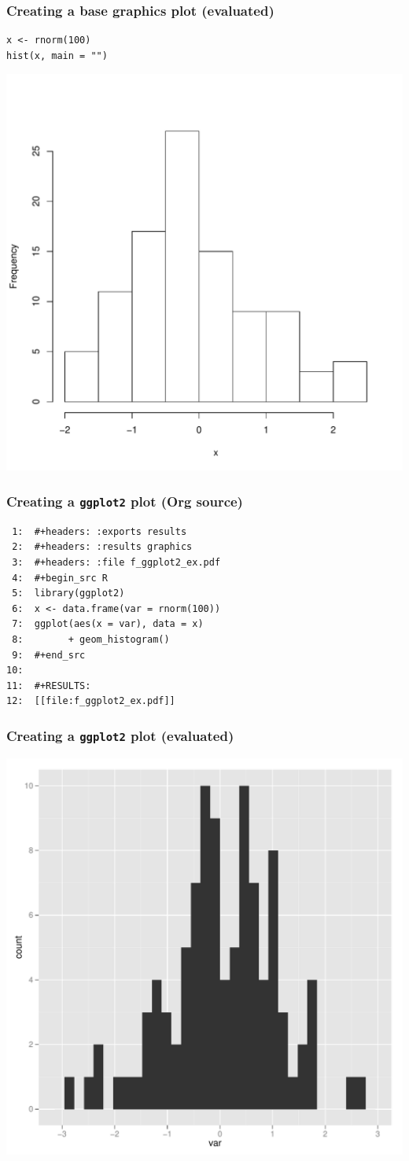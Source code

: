 \documentclass[bigger]{beamer}
\begin{document}
\begin{frame}[fragile]
\frametitle{Creating a base graphics plot (evaluated)}
\label{sec-3-1-7}



\lstset{language=R}
\begin{lstlisting}
x <- rnorm(100)
hist(x, main = "")
\end{lstlisting}


\includegraphics[width = 0.6\linewidth]{../fig/f_baseplot.pdf}
\end{frame}
\begin{frame}[fragile]
\frametitle{Creating a \texttt{ggplot2} plot (Org source)}
\label{sec-3-1-8}



\begin{verbatim}
 1:  #+headers: :exports results 
 2:  #+headers: :results graphics
 3:  #+headers: :file f_ggplot2_ex.pdf
 4:  #+begin_src R 
 5:  library(ggplot2)
 6:  x <- data.frame(var = rnorm(100))
 7:  ggplot(aes(x = var), data = x) 
 8:        + geom_histogram()
 9:  #+end_src 
10:  
11:  #+RESULTS:
12:  [[file:f_ggplot2_ex.pdf]]
\end{verbatim}
\end{frame}
\begin{frame}
\frametitle{Creating a \texttt{ggplot2} plot (evaluated)}
\label{sec-3-1-9}


 

\includegraphics[width = 0.7\linewidth]{../fig/f_ggplot2_example.pdf}
\end{frame}
\end{document}
